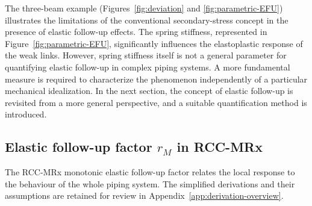 \documentclass[10pt,a4paper]{article}
\begin{document}
The three-beam example (Figures~\ref{fig:deviation} and \ref{fig:parametric-EFU}) illustrates the limitations of the conventional secondary-stress concept in the presence of elastic follow-up effects. The spring stiffness, represented in Figure~\ref{fig:parametric-EFU}, significantly influences the elastoplastic response of the weak links. However, spring stiffness itself is not a general parameter for quantifying elastic follow-up in complex piping systems. A more fundamental measure is required to characterize the phenomenon independently of a particular mechanical idealization. In the next section, the concept of elastic follow-up is revisited from a more general perspective, and a suitable quantification method is introduced.

\FloatBarrier



\clearpage
\subsection{Elastic follow-up factor $r_M$ in RCC-MRx}
\label{sec:rccmrx}

The RCC-MRx monotonic elastic follow-up factor relates the local response to the behaviour of the whole piping system. The simplified derivations and their assumptions are retained for review in Appendix~\ref{app:derivation-overview}.
\end{document}
